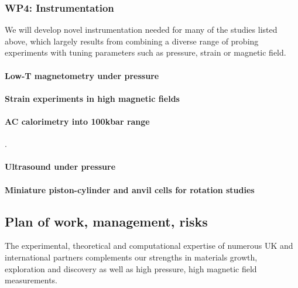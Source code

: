 \subsubsection*{WP4: Instrumentation}
\noindent We will develop novel instrumentation needed for many of the studies listed above, which largely results from combining a diverse range of probing experiments with tuning parameters such as pressure, strain or magnetic field.
\paragraph{Low-T magnetometry under pressure} 
\paragraph{Strain experiments in high magnetic fields} 
\paragraph{AC calorimetry into 100kbar range}  \cite{squire23}.
\paragraph{Ultrasound under pressure}
\paragraph{Miniature piston-cylinder and anvil cells for rotation studies}

\subsection*{Plan of work, management,
risks}
\noindent
The experimental, theoretical and computational expertise of numerous UK and international partners complements our strengths in materials growth, exploration and discovery as well as high pressure, high magnetic field measurements. 


